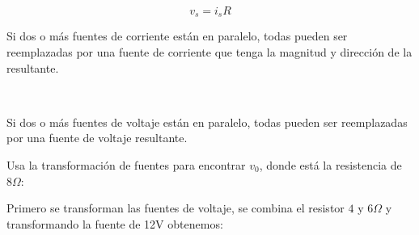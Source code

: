\begin{equation}
	v_{s}=i_{s}R
\end{equation}

\begin{definition}
	Si dos o más fuentes de corriente están en paralelo, todas pueden ser reemplazadas por una fuente de corriente que tenga la magnitud y dirección de la resultante.
\end{definition}
\
\begin{definition}
	Si dos o más fuentes de voltaje están en paralelo, todas pueden ser reemplazadas por una fuente de voltaje resultante.
\end{definition}

\begin{example}
	Usa la transformación de fuentes para encontrar $v_{0}$, donde está la resistencia de $8\Omega$:
	\begin{center}
	\end{center}

	Primero se transforman las fuentes de voltaje, se combina el resistor $4$ y $6\Omega$
	y transformando la fuente de 12V obtenemos:
	\begin{center}
	\end{center}
	\vspace{1cm}
	\begin{center}
	\end{center}


\end{example}
